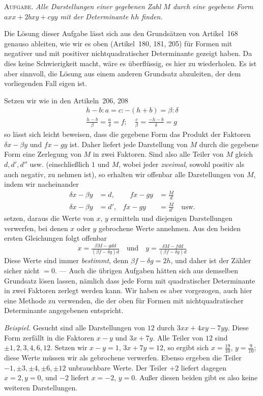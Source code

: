 \textsc{Aufgabe.} \textit{Alle Darstellungen einer gegebenen Zahl $M$ durch eine gegebene Form $axx+2bxy+cyy$ mit der Determinante $hh$ finden.}

Die Lösung dieser Aufgabe lässt sich aus den Grundsätzen von Artikel~168 genauso ableiten, wie wir es oben (Artikel~180, 181, 205) für Formen mit negativer und mit positiver nichtquadratischer Determinante gezeigt haben. Da dies keine Schwierigkeit macht, wäre es überflüssig, es hier zu wiederholen. Es ist aber sinnvoll, die Lösung aus einem anderen Grundsatz abzuleiten, der dem vorliegenden Fall eigen ist.

Setzen wir wie in den Artikeln~206, 208
\[
\begin{gathered}
h-b:a=c:-(h+b)=\beta:\delta\\
\frac{h-b}{\beta}=\frac a\delta=f;\quad
\frac c\beta=\frac{-h-b}{\delta}=g
\end{gathered}
\]
so lässt sich leicht beweisen, dass die gegebene Form das Produkt der Faktoren $\delta x-\beta y$ und $fx-gy$ ist. Daher liefert jede Darstellung von $M$ durch die gegebene Form eine Zerlegung von $M$ in zwei Faktoren. Sind also alle Teiler von $M$ gleich $d,d',d''$ usw. (einschließlich $1$ und $M$, wobei jeder \textit{zweimal}, sowohl positiv als auch negativ, zu nehmen ist), so erhalten wir offenbar alle Darstellungen von $M$, indem wir nacheinander
\[
\begin{aligned}
\delta x-\beta y&=d,&\quad fx-gy&=\frac M d\\
\delta x-\beta y&=d',& fx-gy&=\frac M{d'}\quad\text{usw.}
\end{aligned}
\]
setzen, daraus die Werte von $x$, $y$ ermitteln und diejenigen Darstellungen verwerfen, bei denen $x$
oder $y$ gebrochene Werte annehmen. Aus den beiden ersten Gleichungen folgt offenbar
\[
x=\tfrac{\beta M-gdd}{(\beta f-\delta g)d}\quad\text{und}\quad
y=\tfrac{\delta M-fdd}{(\beta f-\delta g)d}
\]
Diese Werte sind immer \textit{bestimmt}, denn $\beta f-\delta g=2h$, und daher ist der Zähler sicher nicht $=0$. --- Auch die übrigen Aufgaben hätten sich aus demselben Grundsatz lösen lassen, nämlich dass jede Form mit quadratischer Determinante in zwei Faktoren zerlegt werden kann. Wir haben es aber vorgezogen, auch hier eine Methode zu verwenden, die der oben für Formen mit nichtquadratischer Determinante angegebenen entspricht.

\textit{Beispiel.} Gesucht sind alle Darstellungen von $12$ durch $3xx+4xy-7yy$. Diese Form zerfällt in die Faktoren $x-y$ und $3x+7y$. Alle Teiler von $12$ sind $\pm1,2,3,4,6,12$. Setzen wir $x-y=1$, $3x+7y=12$, so ergibt sich $x=\frac{19}{10}$, $y=\frac9{10}$; diese Werte müssen wir als gebrochene verwerfen. Ebenso ergeben die Teiler $-1,\pm3,\pm4,\pm6,\pm12$ unbrauchbare Werte. Der Teiler $+2$ liefert dagegen $x=2,y=0$, und $-2$ liefert $x=-2$, $y=0$. Außer diesen beiden gibt es also keine weiteren Darstellungen.

